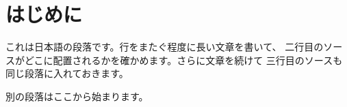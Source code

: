 \documentclass[uplatex,dvipdfmx]{jsarticle}
\begin{document}
\section{はじめに}
これは日本語の段落です。行をまたぐ程度に長い文章を書いて、
二行目のソースがどこに配置されるかを確かめます。さらに文章を続けて
三行目のソースも同じ段落に入れておきます。

別の段落はここから始まります。
\end{document}
